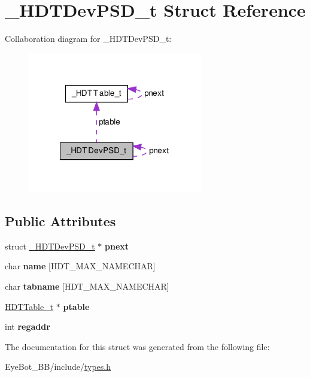 \hypertarget{struct___h_d_t_dev_p_s_d__t}{\section{\-\_\-\-H\-D\-T\-Dev\-P\-S\-D\-\_\-t \-Struct \-Reference}
\label{struct___h_d_t_dev_p_s_d__t}
}


\-Collaboration diagram for \-\_\-\-H\-D\-T\-Dev\-P\-S\-D\-\_\-t\-:\nopagebreak
\begin{figure}[H]
\begin{center}
\leavevmode
\includegraphics[width=216pt]{struct___h_d_t_dev_p_s_d__t__coll__graph}
\end{center}
\end{figure}
\subsection*{\-Public \-Attributes}
\begin{DoxyCompactItemize}
\item 
\hypertarget{struct___h_d_t_dev_p_s_d__t_a6b93c649159d949b64b205537d93d259}{struct \hyperlink{struct___h_d_t_dev_p_s_d__t}{\-\_\-\-H\-D\-T\-Dev\-P\-S\-D\-\_\-t} $\ast$ {\bfseries pnext}}\label{struct___h_d_t_dev_p_s_d__t_a6b93c649159d949b64b205537d93d259}

\item 
\hypertarget{struct___h_d_t_dev_p_s_d__t_abf90a3e13a8313c780d312675b57d09e}{char {\bfseries name} \mbox{[}\-H\-D\-T\-\_\-\-M\-A\-X\-\_\-\-N\-A\-M\-E\-C\-H\-A\-R\mbox{]}}\label{struct___h_d_t_dev_p_s_d__t_abf90a3e13a8313c780d312675b57d09e}

\item 
\hypertarget{struct___h_d_t_dev_p_s_d__t_a56394ad194e4f39a27b7c4d7469edc59}{char {\bfseries tabname} \mbox{[}\-H\-D\-T\-\_\-\-M\-A\-X\-\_\-\-N\-A\-M\-E\-C\-H\-A\-R\mbox{]}}\label{struct___h_d_t_dev_p_s_d__t_a56394ad194e4f39a27b7c4d7469edc59}

\item 
\hypertarget{struct___h_d_t_dev_p_s_d__t_ade5b459848d4107b3bbb46a2a9f84518}{\hyperlink{struct___h_d_t_table__t}{\-H\-D\-T\-Table\-\_\-t} $\ast$ {\bfseries ptable}}\label{struct___h_d_t_dev_p_s_d__t_ade5b459848d4107b3bbb46a2a9f84518}

\item 
\hypertarget{struct___h_d_t_dev_p_s_d__t_a7f2859f47bb71eb86531c61a85352736}{int {\bfseries regaddr}}\label{struct___h_d_t_dev_p_s_d__t_a7f2859f47bb71eb86531c61a85352736}

\end{DoxyCompactItemize}


\-The documentation for this struct was generated from the following file\-:\begin{DoxyCompactItemize}
\item 
\-Eye\-Bot\-\_\-\-B\-B/include/\hyperlink{types_8h}{types.\-h}\end{DoxyCompactItemize}
